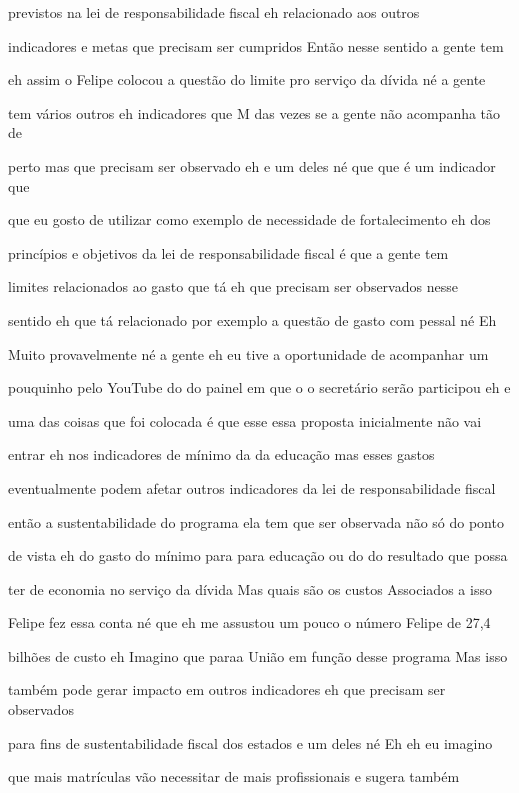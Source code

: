 \documentclass[a4paper,12pt]{article}
\begin{document}
previstos na lei de responsabilidade fiscal eh relacionado aos outros

indicadores e metas que precisam ser cumpridos Então nesse sentido a gente tem

eh assim o Felipe colocou a questão do limite pro serviço da dívida né a gente

tem vários outros eh indicadores que M das vezes se a gente não acompanha tão de

perto mas que precisam ser observado eh e um deles né que que é um indicador que

que eu gosto de utilizar como exemplo de necessidade de fortalecimento eh dos

princípios e objetivos da lei de responsabilidade fiscal é que a gente tem

limites relacionados ao gasto que tá eh que precisam ser observados nesse

sentido eh que tá relacionado por exemplo a questão de gasto com pessal né Eh

Muito provavelmente né a gente eh eu tive a oportunidade de acompanhar um

pouquinho pelo YouTube do do painel em que o o secretário serão participou eh e

uma das coisas que foi colocada é que esse essa proposta inicialmente não vai

entrar eh nos indicadores de mínimo da da educação mas esses gastos

eventualmente podem afetar outros indicadores da lei de responsabilidade fiscal

então a sustentabilidade do programa ela tem que ser observada não só do ponto

de vista eh do gasto do mínimo para para educação ou do do resultado que possa

ter de economia no serviço da dívida Mas quais são os custos Associados a isso

Felipe fez essa conta né que eh me assustou um pouco o número Felipe de 27,4

bilhões de custo eh Imagino que paraa União em função desse programa Mas isso

também pode gerar impacto em outros indicadores eh que precisam ser observados

para fins de sustentabilidade fiscal dos estados e um deles né Eh eh eu imagino

que mais matrículas vão necessitar de mais profissionais e sugera também
\end{document}
